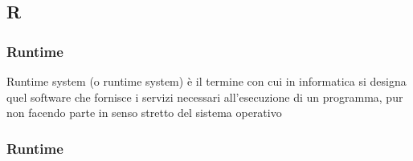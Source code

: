 \subsection*{\textbf{\hfill \Huge{R} \hfill}} 
\subsubsection*{Runtime}
Runtime system (o runtime system) è il termine con cui in informatica si designa quel software che fornisce i servizi necessari all'esecuzione di un programma, pur non facendo parte in senso stretto del sistema operativo
\subsubsection*{Runtime}

